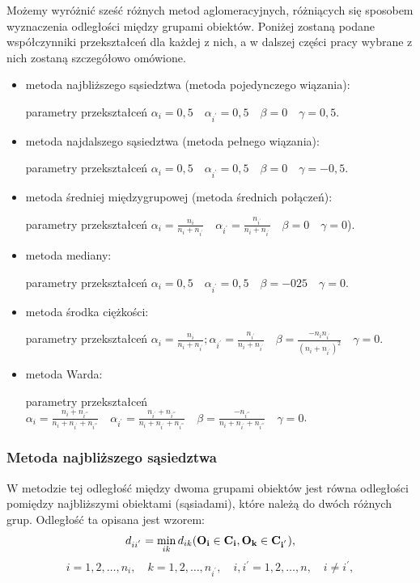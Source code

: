 \documentclass[12pt,a4paper]{report}
\begin{document}
Możemy wyróżnić sześć różnych metod aglomeracyjnych, różniących się sposobem wyznaczenia odległości między grupami obiektów. Poniżej zostaną podane współczynniki przekształceń dla każdej z nich, a w dalszej części pracy wybrane z nich zostaną szczegółowo omówione.
\begin{itemize}
\item metoda najbliższego sąsiedztwa (metoda pojedynczego wiązania):

parametry  przekształceń $\alpha_{i}=0,5 \quad \alpha_{i^{'}}=0,5 \quad  \beta=0 \quad \gamma=0,5$.
\item metoda najdalszego sąsiedztwa (metoda pełnego wiązania):

parametry  przekształceń $\alpha_{i}=0,5 \quad \alpha_{i^{'}}=0,5 \quad \beta=0 \quad \gamma=-0,5$.
\item metoda średniej międzygrupowej (metoda średnich połączeń):

parametry  przekształceń $\alpha_{i}=\frac{n_{i}}{n_{i} + n_{i^{'}}} \quad \alpha_{i^{'}}=\frac{n_{i^{'}}}{n_{i} + n_{i^{'}}} \quad \beta=0 \quad \gamma=0$).
\item metoda mediany:

parametry  przekształceń $\alpha_{i}=0,5 \quad \alpha_{i^{'}}=0,5 \quad \beta=-025 \quad \gamma=0$.
\item metoda środka ciężkości:

parametry  przekształceń $\alpha_{i}=\frac{n_{i}}{n_{i} + n_{i^{'}}}; \alpha_{i^{'}}=\frac{n_{i^{'}}}{n_{i} + n_{i^{'}}} \quad \beta=\frac{-n_{i}n_{i^{'}}}{(n_{i} + n_{i^{'}})^{2}} \quad \gamma=0$.
\item metoda Warda:

parametry  przekształceń $\alpha_{i}=\frac{n_{i}+n_{i^{'''}}}{n_{i} + n_{i^{'}}+n_{i^{'''}}} \quad \alpha_{i^{'}}=\frac{n_{i^{'}}+n_{i^{'''}}}{n_{i} + n_{i^{'}}+n_{i^{'''}}} \quad \beta=\frac{-n_{i^{'''}}}{n_{i} + n_{i^{'}}+n_{i^{'''}}} \quad \gamma=0$.

\end{itemize}
 
\subsubsection{Metoda najbliższego sąsiedztwa}


W metodzie tej odległość między dwoma grupami obiektów jest równa odległości pomiędzy najbliższymi obiektami (sąsiadami), które należą do dwóch różnych grup. Odległość ta opisana jest wzorem:
$$
d_{ii^{'}}= \min\limits_{ik} {d_{ik}(\bf{O_i} \in C_{i}, O_{k} \in C_{i^{'}})},
$$
$$
i=1,2,\dots,n_{i}, \quad k=1,2,\dots,n_{i^{'}}, \quad i,i^{'}=1,2,\dots,n, \quad i \neq i^{'}, 
$$
\end{document}
